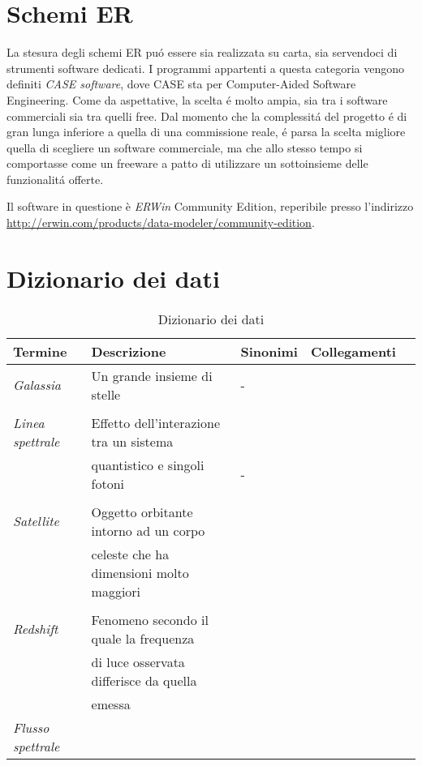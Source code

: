 \documentclass[12pt,a4paper,onecolumn]{article}
\begin{document}
\section{Schemi ER}
\begin{flushleft}
	La stesura degli schemi ER pu\'{o} essere sia realizzata su carta, sia servendoci di strumenti software dedicati. I programmi appartenti a questa categoria vengono definiti \textit{CASE software}, dove CASE sta per Computer-Aided Software Engineering. Come da aspettative, la scelta \'{e} molto ampia, sia tra i software commerciali sia tra quelli free. Dal momento che la complessit\'{a} del progetto \'{e} di gran lunga inferiore a quella di una commissione reale, \'{e} parsa la scelta migliore quella di scegliere un software commerciale, ma che allo stesso tempo si comportasse come un freeware a patto di utilizzare un sottoinsieme delle funzionalit\'{a} offerte.\newline
	
	Il software in questione è \textit{ERWin} Community Edition, reperibile presso l'indirizzo \url{http://erwin.com/products/data-modeler/community-edition}.
\end{flushleft}



\section{Dizionario dei dati}

\begin{table}[h]
	\centering
	\caption{Dizionario dei dati}
	\begin{tabular}{lllll}
		\hline
		\rowcolor[HTML]{66CC99}Termine & Descrizione & Sinonimi & Collegamenti				  \\ \hline
		
		\textit{Galassia}			&	Un grande insieme di stelle					&	-	 &\\
		&												&		 &\\
		\textit{Linea spettrale}	&	Effetto dell'interazione tra un sistema		&  		 &\\
		&   quantistico e singoli fotoni				&	- 	 &\\
		&  					                     		&        &\\
		\textit{Satellite}			& 	Oggetto orbitante intorno ad un corpo		&		 &\\
		& 	celeste che ha dimensioni molto maggiori	&		 &\\
		&												&		 &\\
		\textit{Redshift} 			& 	Fenomeno secondo il quale la frequenza 		&		 &\\
		& 	di luce osservata differisce da quella		&		 &\\
		& 	emessa 										&		 &\\
		\textit{Flusso spettrale}	&												&		 &\\	
	\end{tabular}
\end{table}
\end{document}
